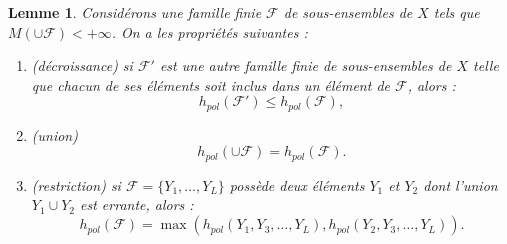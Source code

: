 \documentclass[11pt]{article}
\newtheorem{lemm}[theo]{Lemme}
\theoremstyle{definition}
\numberwithin{equation}{section}
\numberwithin{figure}{section}
\numberwithin{table}{section}
\newcommand*\cF{{\mathcal F}}
\begin{document}
\begin{lemm}\label{lemm.add-mon}
Considérons une famille finie $\cF$ de sous-ensembles de $X$ tels que $M(\cup\cF) < +\infty$. On a les propriétés suivantes :
\begin{enumerate}
\item \label{2.2.1} (décroissance) si $\cF'$ est une autre famille finie de sous-ensembles de $X$ telle que chacun de ses éléments soit inclus dans un élément de $\cF$, alors :
\[
h_{pol}(\cF') \leq h_{pol}(\cF),
\]
\item \label{2.2.2} (union)
\[
h_{pol}(\cup \cF) = h_{pol}(\cF).
\]
\item \label{2.2.3} (restriction) si $\cF=\{Y_1, \dots, Y_L \}$ possède deux éléments $Y_1$ et $Y_2$ dont l'union $Y_{1} \cup Y_2$ est errante, alors :
\[
h_{pol}(\cF) = \max(h_{pol}(Y_{1},Y_3, \dots, Y_{L}), h_{pol}(Y_{2},Y_3, \dots, Y_{L})).
\]
\end{enumerate}
\end{lemm}
\end{document}
